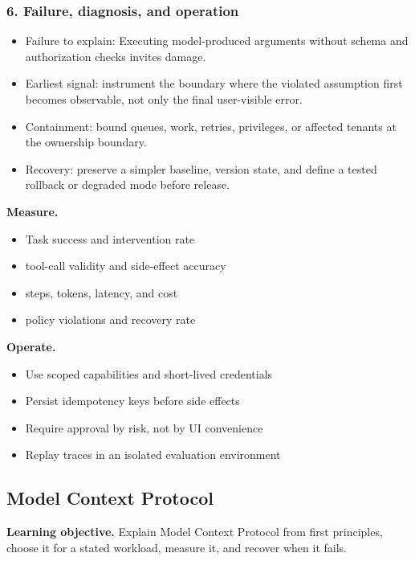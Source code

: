 \subsubsection*{6. Failure, diagnosis, and operation}
\begin{itemize}
\item Failure to explain: Executing model-produced arguments without schema and authorization checks invites damage.
\item Earliest signal: instrument the boundary where the violated assumption first becomes observable, not only the final user-visible error.
\item Containment: bound queues, work, retries, privileges, or affected tenants at the ownership boundary.
\item Recovery: preserve a simpler baseline, version state, and define a tested rollback or degraded mode before release.
\end{itemize}
\textbf{Measure.}\begin{itemize}
\item Task success and intervention rate
\item tool-call validity and side-effect accuracy
\item steps, tokens, latency, and cost
\item policy violations and recovery rate
\end{itemize}
\textbf{Operate.}\begin{itemize}
\item Use scoped capabilities and short-lived credentials
\item Persist idempotency keys before side effects
\item Require approval by risk, not by UI convenience
\item Replay traces in an isolated evaluation environment
\end{itemize}
\subsection{Model Context Protocol}
\textbf{Learning objective.} Explain Model Context Protocol from first principles, choose it for a stated workload, measure it, and recover when it fails.
